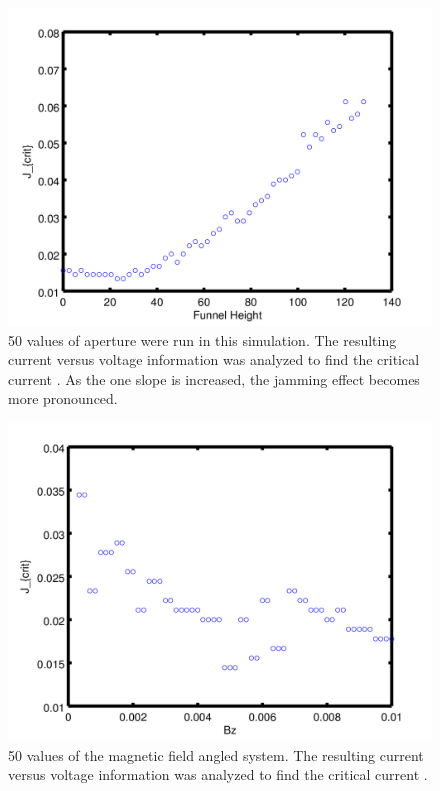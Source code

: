 \begin{figure}[htbp]
\begin{center}
\includegraphics[scale=.50]{oneSideY.png}
\caption{ 50 values of aperture were run in this simulation. The resulting current versus voltage information was analyzed to find the critical current . As the one slope is increased, the jamming effect becomes more pronounced. }
\label{oneYscan}
\end{center}
\end{figure}


\begin{figure}[htbp]
\begin{center}
\includegraphics[scale=.50]{2DAngleBz.png}
\caption{ 50 values of the magnetic field angled system. The resulting current versus voltage information was analyzed to find the critical current .  }
\label{angleBz}
\end{center}
\end{figure}


